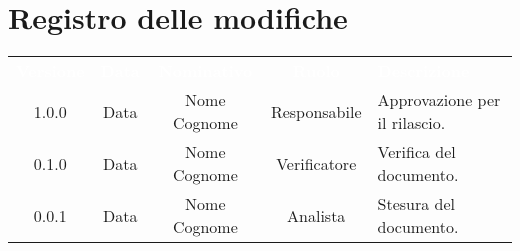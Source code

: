 \section*{Registro delle modifiche}
{
\renewcommand{\arraystretch}{1.5}
\centering
\begin{longtable}{ c c  c  c C{4cm}}
\textcolor{white}{\textbf{Versione}} & \textcolor{white}{\textbf{Data}} & \textcolor{white}{\textbf{Nominativo}} & \textcolor{white}{\textbf{Ruolo}} & \textcolor{white}{\textbf{Descrizione}}\\	


1.0.0 & Data & Nome Cognome & Responsabile & Approvazione per il rilascio.  \\
		
0.1.0 & Data & Nome Cognome & Verificatore & Verifica del documento.  \\
		
0.0.1 & Data & Nome Cognome & Analista & Stesura del documento.  \\
		
		
\end{longtable}
}